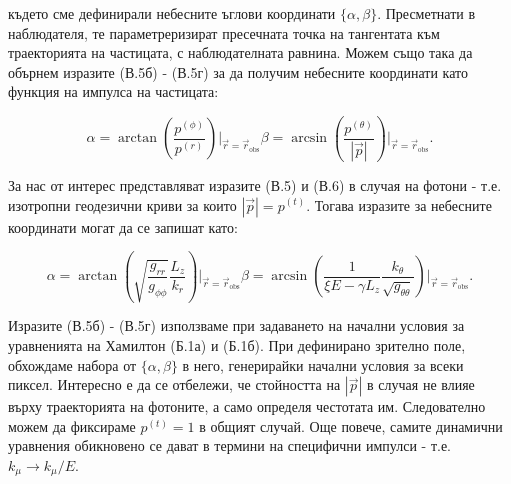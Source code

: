 \begin{appendices}
където сме дефинирали небесните ъглови координати $\{\alpha,\beta\}$. Пресметнати в наблюдателя, те параметреризират пресечната точка на тангентата към траекторията на частицата, с наблюдателната равнина. Можем също така да обърнем изразите (В.5б) - (В.5г) за да получим небесните координати като функция на импулса на частицата:

\begin{subequations}
	\begin{equation}
		\alpha = \arctan\left(\frac{p^{(\phi)}}{p^{(r)}}\right)\bigg\vert_{\vec{r} = \vec{r}_\text{obs}}
	\end{equation}
	\begin{equation}
		\beta = \arcsin\left(\frac{p^{(\theta)}}{|\vec{p}|}\right)\bigg\vert_{\vec{r} = \vec{r}_\text{obs}}.
	\end{equation}
\end{subequations}

За нас от интерес представляват изразите (В.5) и (В.6) в случая на фотони - т.е. изотропни геодезични криви за които $|\vec{p}| = p^{(t)}$. Тогава изразите за небесните координати могат да се запишат като:

\begin{subequations}
	\begin{equation}
		\alpha = \arctan\left(\sqrt{\frac{g_{rr}}{g_{\phi\phi}}}\frac{L_z}{k_r}\right)\bigg\vert_{\vec{r} = \vec{r}_\text{obs}}
	\end{equation}
	\begin{equation}
		\beta = \arcsin\left(\frac{1}{\xi E - \gamma L_z}\frac{k_\theta}{\sqrt{g_{\theta\theta}}}\right)\bigg\vert_{\vec{r} = \vec{r}_\text{obs}}.
	\end{equation}
\end{subequations}

Изразите (В.5б) - (В.5г) използваме при задаването на начални условия за уравненията на Хамилтон (Б.1а) и (Б.1б). При дефинирано зрително поле, обхождаме набора от $\{\alpha,\beta\}$ в него, генерирайки начални условия за всеки пиксел. Интересно е да се отбележи, че стойността на $|\vec{p}|$ в случая не влияе върху траекторията на фотоните, а само определя честотата им. Следователно можем да фиксираме $p^{(t)} = 1$ в общият случай. Още повече, самите динамични уравнения обикновено се дават в термини на специфични импулси - т.е. $k_\mu\rightarrow k_\mu / E$.

\end{appendices}
